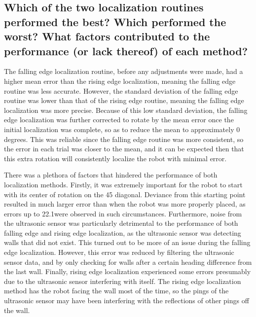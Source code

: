 \documentclass[11pt]{article}
\begin{document}
\subsection{Which of the two localization routines performed the best? Which performed the worst?
What factors contributed to the performance (or lack thereof) of each method?}
\par The falling edge localization routine, before any adjustments were made, had a higher mean error
than the rising edge localization, meaning the falling edge routine was less accurate. However, the
standard deviation of the falling edge routine was lower than that of the rising edge routine,
meaning the falling edge localization was more precise. Because of this low standard deviation, the
falling edge localization was further corrected to rotate by the mean error once the initial
localization was complete, so as to reduce the mean to approximately 0 degrees. This was reliable
since the falling edge routine was more consistent, so the error in each trial was closer to the
mean, and it can be expected then that this extra rotation will consistently localize the robot with
minimal error. 

\par There was a plethora of factors that hindered the performance of both localization methods. Firstly,
it was extremely important for the robot to start with its center of rotation on the 45\degree 
 diagonal. Deviance from this starting point resulted in much larger error than when the robot was
more properly placed, as errors up to 22.1\degree  were observed in such circumstances. Furthermore,
noise from the ultrasonic sensor was particularly detrimental to the performance of both falling
edge and rising edge localization, as the ultrasonic sensor was detecting walls that did not exist.
This turned out to be more of an issue during the falling edge localization. However, this error was
reduced by filtering the ultrasonic sensor data, and by only checking for walls after a certain
heading difference from the last wall. Finally, rising edge localization experienced some errors
presumably due to the ultrasonic sensor interfering with itself. The rising edge localization method
has the robot facing the wall most of the time, so the pings of the ultrasonic sensor may have been
interfering with the reflections of other pings off the wall.
\end{document}
